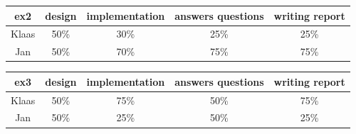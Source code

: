 \documentclass[a4paper]{article}
\begin{document}
\begin{table}[H]
\centering
\begin{tabular}{ccccc}
ex2 & design & implementation & answers questions & writing report \\
\hline
Klaas & 50\% & 30\% & 25\% & 25\% \\
\hline
Jan & 50\% & 70\% & 75\% & 75\% \\
\end{tabular}
\end{table}

\begin{table}[H]
\centering
\begin{tabular}{ccccc}
ex3 & design & implementation & answers questions & writing report \\
\hline
Klaas & 50\% & 75\% & 50\% & 75\% \\
\hline
Jan & 50\% & 25\% & 50\% & 25\% \\
\end{tabular}
\end{table} 
\end{document}

